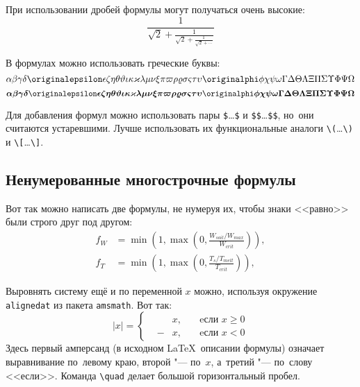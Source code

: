 При использовании дробей формулы могут получаться очень высокие:
\[
  \frac{1}{\sqrt{2}+
  \displaystyle\frac{1}{\sqrt{2}+
  \displaystyle\frac{1}{\sqrt{2}+\cdots}}}
\]

В формулах можно использовать греческие буквы:
\[
\alpha\beta\gamma\delta\originalepsilon\epsilon\zeta\eta\theta%
\vartheta\iota\kappa\varkappa\lambda\mu\nu\xi\pi\varpi\rho\varrho%
\sigma\varsigma\tau\upsilon\originalphi\phi\chi\psi\omega\Gamma\Delta%
\Theta\Lambda\Xi\Pi\Sigma\Upsilon\Phi\Psi\Omega
\]
\[%
\boldsymbol{\alpha\beta\gamma\delta\originalepsilon\epsilon\zeta\eta%
\theta\vartheta\iota\kappa\varkappa\lambda\mu\nu\xi\pi\varpi\rho%
\varrho\sigma\varsigma\tau\upsilon\originalphi\phi\chi\psi\omega\Gamma%
\Delta\Theta\Lambda\Xi\Pi\Sigma\Upsilon\Phi\Psi\Omega}
\]

Для добавления формул можно использовать пары \verb+$+\dots\verb+$+ и \verb+$$+\dots\verb+$$+,
но~они считаются устаревшими.
Лучше использовать их функциональные аналоги \verb+\(+\dots\verb+\)+ и \verb+\[+\dots\verb+\]+.

\subsection{Ненумерованные многострочные формулы}\label{subsec:ch1/sec3/sub2}

Вот так можно написать две формулы, не нумеруя их, чтобы знаки <<равно>> были
строго друг под другом:
\begin{align}
  f_W & =  \min \left( 1, \max \left( 0, \frac{W_{soil} / W_{max}}{W_{crit}} \right)  \right), \nonumber \\
  f_T & =  \min \left( 1, \max \left( 0, \frac{T_s / T_{melt}}{T_{crit}} \right)  \right), \nonumber
\end{align}

Выровнять систему ещё и по переменной \( x \) можно, используя окружение
\verb|alignedat| из пакета \verb|amsmath|. Вот так:
\[
    |x| = \left\{
    \begin{alignedat}{2}
        &&x, \quad &\text{eсли } x\geqslant 0 \\
        &-&x, \quad & \text{eсли } x<0
    \end{alignedat}
    \right.
\]
Здесь первый амперсанд (в исходном \LaTeX\ описании формулы) означает
выравнивание по~левому краю, второй "--- по~\( x \), а~третий "--- по~слову
<<если>>. Команда \verb|\quad| делает большой горизонтальный пробел.

